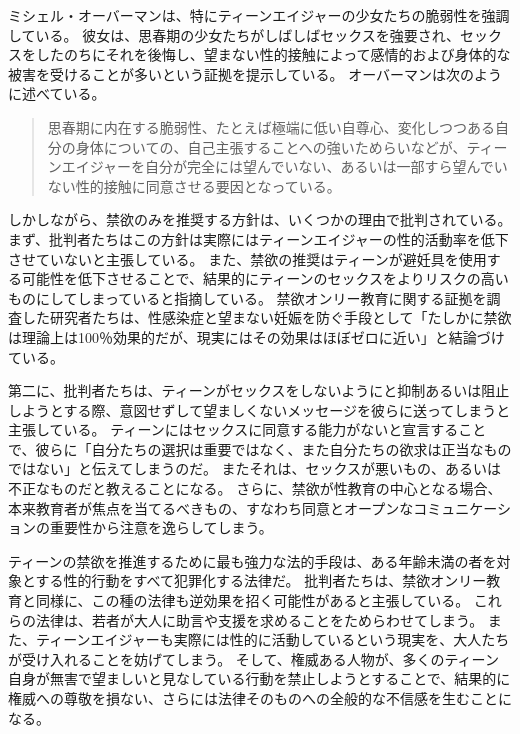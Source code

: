 \documentclass[paper=a4,book,openany]{jlreq}
\begin{document}
ミシェル・オーバーマンは、特にティーンエイジャーの少女たちの脆弱性を強調している。
彼女は、思春期の少女たちがしばしばセックスを強要され、セックスをしたのちにそれを後悔し、望まない性的接触によって感情的および身体的な被害を受けることが多いという証拠を提示している。
オーバーマンは次のように述べている。

\begin{quote}
思春期に内在する脆弱性、たとえば極端に低い自尊心、変化しつつある自分の身体についての、自己主張することへの強いためらいなどが、ティーンエイジャーを自分が完全には望んでいない、あるいは一部すら望んでいない性的接触に同意させる要因となっている。
\citep[p.709]{oberman01:_girls_master_house}
\end{quote}

しかしながら、禁欲のみを推奨する方針は、いくつかの理由で批判されている。
まず、批判者たちはこの方針は実際にはティーンエイジャーの性的活動率を低下させていないと主張している。
また、禁欲の推奨はティーンが避妊具を使用する可能性を低下させることで、結果的にティーンのセックスをよりリスクの高いものにしてしまっていると指摘している。
禁欲オンリー教育に関する証拠を調査した研究者たちは、性感染症と望まない妊娠を防ぐ手段として「たしかに禁欲は理論上は100％効果的だが、現実にはその効果はほぼゼロに近い」と結論づけている\citep{santelli06:_abstin_abstin_only_educat}。

第二に、批判者たちは、ティーンがセックスをしないようにと抑制あるいは阻止しようとする際、意図せずして望ましくないメッセージを彼らに送ってしまうと主張している。
ティーンにはセックスに同意する能力がないと宣言することで、彼らに「自分たちの選択は重要ではなく、また自分たちの欲求は正当なものではない」と伝えてしまうのだ。
またそれは、セックスが悪いもの、あるいは不正なものだと教えることになる。
さらに、禁欲が性教育の中心となる場合、本来教育者が焦点を当てるべきもの、すなわち同意とオープンなコミュニケーションの重要性から注意を逸らしてしまう。

ティーンの禁欲を推進するために最も強力な法的手段は、ある年齢未満の者を対象とする性的行動をすべて犯罪化する法律だ。
批判者たちは、禁欲オンリー教育と同様に、この種の法律も逆効果を招く可能性があると主張している。
これらの法律は、若者が大人に助言や支援を求めることをためらわせてしまう。
また、ティーンエイジャーも実際には性的に活動しているという現実を、大人たちが受け入れることを妨げてしまう。
そして、権威ある人物が、多くのティーン自身が無害で望ましいと見なしている行動を禁止しようとすることで、結果的に権威への尊敬を損ない、さらには法律そのものへの全般的な不信感を生むことになる。
\end{document}
